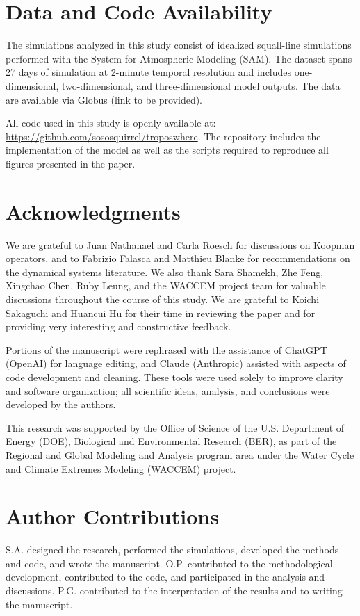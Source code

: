 \documentclass[11pt]{article}
\begin{document}
\section{Data and Code Availability}

The simulations analyzed in this study consist of idealized squall-line simulations performed with the System for Atmospheric Modeling (SAM). The dataset spans 27 days of simulation at 2-minute temporal resolution and includes one-dimensional, two-dimensional, and three-dimensional model outputs. The data are available via Globus (link to be provided).

All code used in this study is openly available at: \url{https://github.com/sososquirrel/troposwhere}. The repository includes the implementation of the model as well as the scripts required to reproduce all figures presented in the paper.

\section{Acknowledgments}

We are grateful to Juan Nathanael and Carla Roesch for discussions on Koopman operators, and to Fabrizio Falasca and Matthieu Blanke for recommendations on the dynamical systems literature. We also thank Sara Shamekh, Zhe Feng, Xingchao Chen, Ruby Leung, and the WACCEM project team for valuable discussions throughout the course of this study. We are grateful to Koichi Sakaguchi and Huancui Hu for their time in reviewing the paper and for providing very interesting and constructive feedback.

Portions of the manuscript were rephrased with the assistance of ChatGPT (OpenAI) for language editing, and Claude (Anthropic) assisted with aspects of code development and cleaning. These tools were used solely to improve clarity and software organization; all scientific ideas, analysis, and conclusions were developed by the authors.


This research was supported by the Office of Science of the U.S. Department of Energy (DOE), Biological and Environmental Research (BER), as part of the Regional and Global Modeling and Analysis program area under the Water Cycle and Climate Extremes Modeling (WACCEM) project.

\section{Author Contributions}

S.A. designed the research, performed the simulations, developed the methods and code, and wrote the manuscript. O.P. contributed to the methodological development, contributed to the code, and participated in the analysis and discussions. P.G. contributed to the interpretation of the results and to writing the manuscript.


\printbibliography
\end{document}
